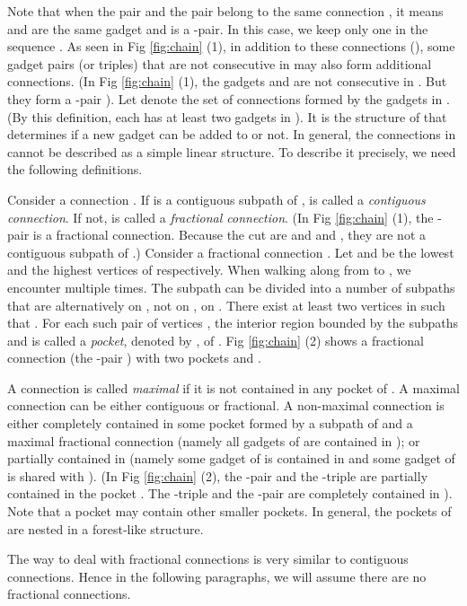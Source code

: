 \documentclass[11pt]{article}
\begin{document}
Note that when the pair  and the pair 
belong to the same connection , it means  and 
are the same gadget and  is a -pair.
In this case, we keep only one  in the sequence
.
As seen in Fig \ref{fig:chain} (1), in addition to these connections
 (), some gadget pairs (or triples) that are not
consecutive in  may also form additional connections.
(In Fig \ref{fig:chain} (1), the gadgets  and  are not consecutive
in . But they form a -pair ). Let 
denote the set of connections formed by the gadgets in .
(By this definition, each  has at least two
gadgets in ).
It is the structure of  that determines if a new gadget  can be
added to  or not. In general, the connections in  cannot be
described as a simple linear structure. To describe it precisely, we need the
following definitions.

Consider a connection . If 
is a contiguous subpath of ,  is called a {\em contiguous
connection}. If not,  is called a {\em fractional connection}.
(In Fig \ref{fig:chain} (1), the -pair  is a
fractional connection.
Because the cut  are
 and  and , they are not a contiguous subpath of .)
Consider a fractional connection
. Let  and  be the lowest and the highest vertices
of  respectively. When walking along 
from  to , we encounter  multiple times.
The subpath  can be divided into a number of subpaths that are
alternatively on , not on ,
on . There exist at least two vertices  in
 such that .
For each such pair of vertices , the interior region bounded by
the subpaths  and  is called a {\em pocket},
denoted by , of .
Fig \ref{fig:chain} (2) shows a fractional connection  (the -pair
) with two pockets  and .

A connection  is called
\emph{maximal} if it is not contained in any pocket of .
A maximal connection can be either contiguous or
fractional. A non-maximal connection  is either
completely contained in some pocket  formed by a subpath of 
and a maximal fractional connection  (namely all gadgets
of  are contained in ); or partially contained in 
(namely some gadget of  is contained in 
and some gadget of  is shared with ).
(In Fig \ref{fig:chain} (2), the -pair  and the -triple
 are partially contained in the pocket . The -triple
 and the -pair  are completely contained in
). Note that a pocket may contain other smaller pockets. In general,
the pockets of  are nested in a forest-like structure.

The way to deal with fractional connections is very similar to contiguous connections.
Hence in the following paragraphs, we will assume there are no fractional connections.
\end{document}
